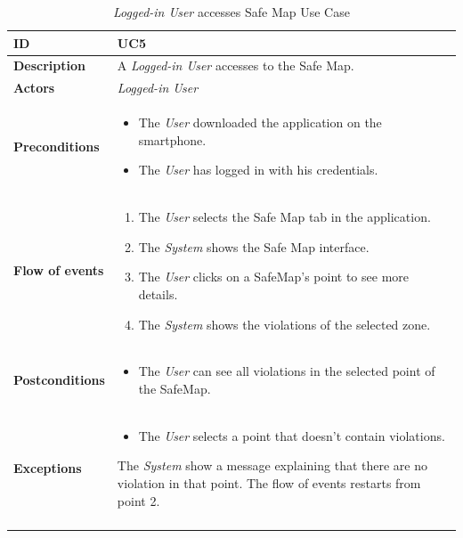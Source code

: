\documentclass {article}
\begin{document}
\pagebreak
	\begin{longtable}{| p{3 cm} | p{10.5 cm} |} 
			\hline
			{\bf ID} & UC5 \\
			\hline
			{\bf Description} & A {\it Logged-in User} accesses to the Safe Map.\\
			\hline
			{\bf Actors} & {\it Logged-in User}\\
			\hline
			{\bf Preconditions} & 	
			\begin{itemize}
				\item The {\it User} downloaded the application on the smartphone.
				\item The {\it User} has logged in with his credentials.
			\end{itemize}
			\\
			\hline
			{\bf Flow of events} &	
			\begin{enumerate}
				\item The {\it User} selects the Safe Map tab in the application.
				\item The {\it System} shows the Safe Map interface.
				\item The {\it User} clicks on a SafeMap's point to see more details. 
				\item The {\it System} shows the violations of the selected zone. 
			\end{enumerate}
			\\
			\hline
			{\bf Postconditions} & 
			\begin{itemize}
				\item The {\it User} can see all violations in the selected point of the  SafeMap.
			\end{itemize}
			\\
			\hline
			{\bf Exceptions} & 	
			\begin{itemize}
				\item The {\it User} selects a point that doesn't contain violations. 
			\end{itemize}
			The {\it System} show a message explaining that there are no violation in that point. The flow of events restarts from point 2. \\
			\hline
			\caption{{\it Logged-in User} accesses Safe Map Use Case}
			\end{longtable}
			\pagebreak
\end{document}
